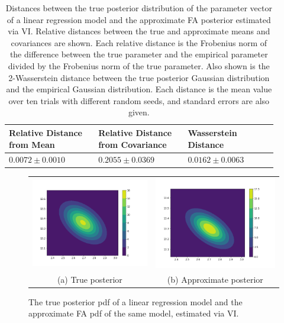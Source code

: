 \documentclass[msc,deptreport.inf]{infthesis} %
\begin{document}
\begin{table}[h!]
	\begin{center}
		\begin{tabular}{|| p{0.3\linewidth} p{0.3\linewidth} p{0.3\linewidth} ||} 
 			\hline
 			Relative Distance from Mean & Relative Distance from Covariance & Wasserstein Distance \\ [0.5ex] 
 			\hline\hline
 			$0.0072 \pm 0.0010$ & $ 0.2055 \pm 0.0369$ & $ 0.0162 \pm 0.0063$ \\ [1ex] 
			\hline
		\end{tabular}
		\caption{Distances between the true posterior distribution of the parameter vector of a linear regression model and the approximate FA posterior estimated via VI. Relative distances between the true and approximate means and covariances are shown. Each relative distance is the Frobenius norm of the difference between the true parameter and the empirical parameter divided by the Frobenius norm of the true parameter. Also shown is the 2-Wasserstein distance between the true posterior Gaussian distribution and the empirical Gaussian distribution. Each distance is the mean value over ten trials with different random seeds, and standard errors are also given.}
		\label{table:linear_regression_vi_posterior}
	\end{center}
\end{table}


\begin{figure}[!htbp] 
	\begin{tabular}{cc}
		 \includegraphics[width=70mm]{plots/linear_model_true_posterior.png}
		 & \includegraphics[width=70mm]{plots/linear_model_vi_posterior__latent_dim=2.png} \\
		 (a) True posterior
		 & (b) Approximate posterior \\[6pt]
	\end{tabular}
	\caption{The true posterior pdf of a linear regression model and the approximate FA pdf of the same model, estimated via VI.}
	\label{fig:linear_regression_vi_posterior}
\end{figure}
\end{document}
